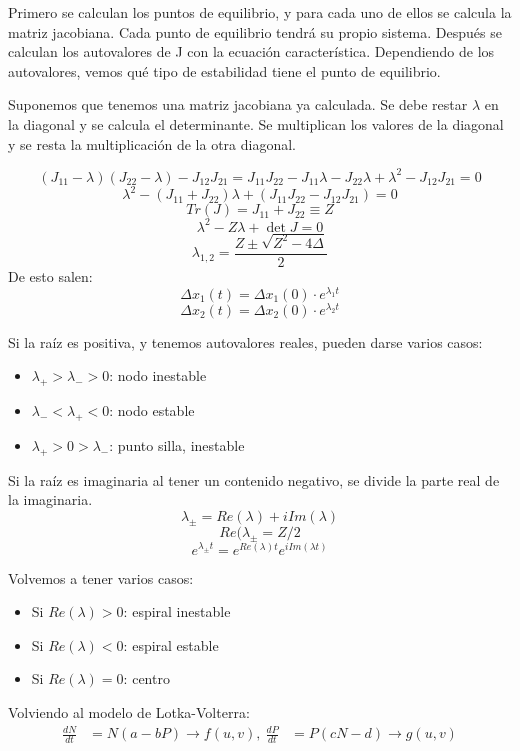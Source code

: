 Primero se calculan los puntos de equilibrio, y para cada uno de ellos se calcula la matriz jacobiana. Cada punto de equilibrio tendrá su propio sistema. Después se calculan los autovalores de J con la ecuación característica. Dependiendo de los autovalores, vemos qué tipo de estabilidad tiene el punto de equilibrio. 

Suponemos que tenemos una matriz jacobiana ya calculada. Se debe restar $\lambda$ en la diagonal y se calcula el determinante. Se multiplican los valores de la diagonal y se resta la multiplicación de la otra diagonal. 

$$(J_{11} - \lambda) (J_{22} - \lambda) - J_{12} J_{21} = J_{11} J_{22} - J_{11} \lambda - J_{22} \lambda + \lambda^2 - J_{12} J_{21} = 0$$
$$\lambda^2 - (J_{11} + J_{22}) \lambda + (J_{11} J_{22} - J_{12} J_{21}) = 0$$
$$Tr(J) = J_{11} + J_{22} \equiv Z$$
$$\lambda^2 - Z \lambda + \det J = 0$$ %
$$\lambda_{1,2} = \frac{Z \pm \sqrt{Z^2 - 4\Delta}}{2}$$
De esto salen:
$$\Delta x_1(t) = \Delta x_1(0) \cdot e^{\lambda_1 t}$$
$$\Delta x_2(t) = \Delta x_2(0) \cdot e^{\lambda_2 t}$$

Si la raíz es positiva, y tenemos autovalores reales, pueden darse varios casos:
\begin{itemize}
\item $\lambda_+ > \lambda_- > 0$: nodo inestable
\item $\lambda_- < \lambda_+ < 0$: nodo estable
\item $\lambda_+ > 0 > \lambda_-$: punto silla, inestable
\end{itemize}

Si la raíz es imaginaria al tener un contenido negativo, se divide la parte real de la imaginaria. 
$$\lambda_{\pm} = Re(\lambda) + iIm(\lambda)$$
$$Re(\lambda_{\pm} = Z/2$$
$$e^{\lambda_{\pm} t} = e^{Re(\lambda) t} e^{i Im(\lambda t)}$$

Volvemos a tener varios casos:
\begin{itemize}
\item Si $Re (\lambda) > 0$: espiral inestable
\item Si $Re(\lambda) < 0$: espiral estable
\item Si $Re(\lambda) = 0$: centro
\end{itemize}

Volviendo al modelo de Lotka-Volterra:
\begin{align*}
\frac{dN}{dt} &= N(a - bP) \rightarrow f(u,v), \
\frac{dP}{dt} &= P(cN - d) \rightarrow g(u, v)
\end{align*}

